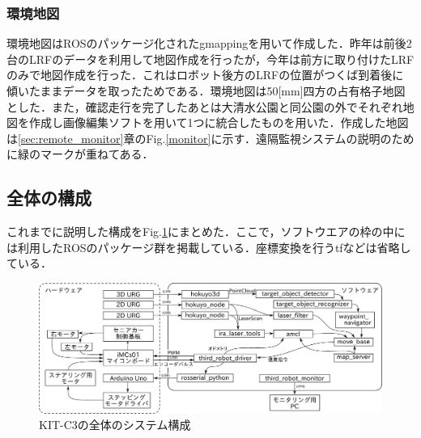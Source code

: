 \documentclass[10pt,a4paper]{jarticle}
\begin{document}
\subsubsection{環境地図}
環境地図はROSのパッケージ化されたgmappingを用いて作成した．昨年は前後2台のLRFのデータを利用して地図作成を行ったが，今年は前方に取り付けたLRFのみで地図作成を行った．これはロボット後方のLRFの位置がつくば到着後に傾いたままデータを取ったためである．環境地図は50[mm]四方の占有格子地図とした．また，確認走行を完了したあとは大清水公園と同公園の外でそれぞれ地図を作成し画像編集ソフトを用いて1つに統合したものを用いた．作成した地図は\ref{sec:remote_monitor}章のFig.\ref{monitor}に示す．遠隔監視システムの説明のために緑のマークが重ねてある．

\subsection{全体の構成}
これまでに説明した構成をFig.\ref{184559_7Dec16}にまとめた．ここで，ソフトウエアの枠の中には利用したROSのパッケージ群を掲載している．座標変換を行うtfなどは省略している．
\begin{figure}[ht]
 \centering
 \includegraphics[width=16cm]{./fig/eps/whole_system.eps}
 \caption{KIT-C3の全体のシステム構成}
 \label{184559_7Dec16}
\end{figure}
\end{document}
